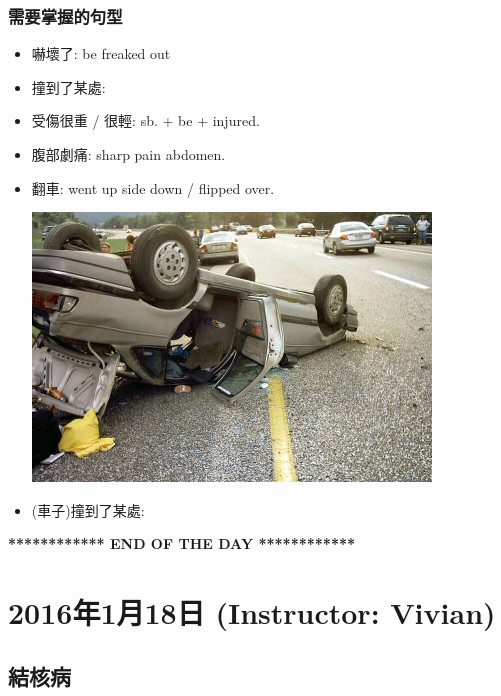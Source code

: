 \subsubsection*{需要掌握的句型}
\begin{itemize}
  \itemsep0em
  \item 嚇壞了: be freaked out
  \item 撞到了某處: 
  \item 受傷很重 / 很輕: sb. + be +  injured.
  \item 腹部劇痛: sharp pain  abdomen.
  \item 翻車: went up side down / flipped over.
  \begin{center}
    \includegraphics[scale=1]{pics/flip-over}
  \end{center}
  \item (車子)撞到了某處: 
\end{itemize}

\vspace{15mm}

\begin{center}
  \textbf{************ END OF THE DAY ************}
\end{center}

\newpage

\section{2016年1月18日 (Instructor: Vivian)}
\subsection{結核病}
